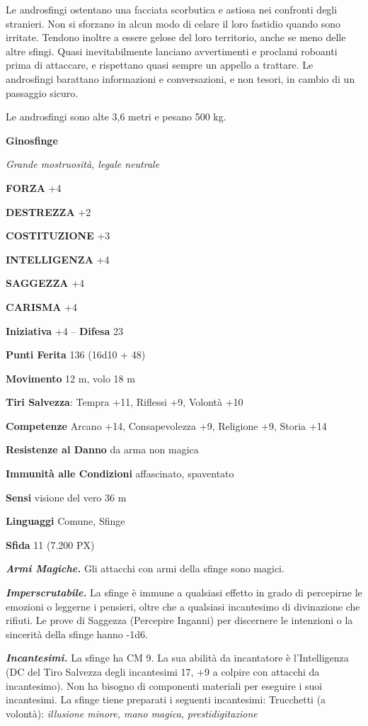 \begin{multicols}{2}
	Le androsfingi ostentano una facciata scorbutica e astiosa nei confronti degli stranieri. Non si sforzano in alcun modo di celare il loro fastidio quando sono irritate. Tendono inoltre a essere gelose del loro territorio, anche se meno delle altre sfingi. Quasi inevitabilmente lanciano avvertimenti e proclami roboanti prima di attaccare, e rispettano quasi sempre un appello a trattare. Le androsfingi barattano informazioni e conversazioni, e non tesori, in cambio di un passaggio sicuro.

	Le androsfingi sono alte 3,6 metri e pesano 500 kg.


	\medskip{}\textbf{Ginosfinge}

	\textit{Grande mostruosità, legale neutrale}

	\textbf{FORZA} +4

	\textbf{DESTREZZA} +2

	\textbf{COSTITUZIONE} +3

	\textbf{INTELLIGENZA} +4

	\textbf{SAGGEZZA} +4

	\textbf{CARISMA} +4

	\textbf{Iniziativa} +4 -- \textbf{Difesa} 23

	\textbf{Punti Ferita} 136 (16d10 + 48)

	\textbf{Movimento} 12 m, volo 18 m

	\textbf{Tiri Salvezza}: Tempra +11, Riflessi +9, Volontà +10

	\textbf{Competenze} Arcano +14, Consapevolezza +9, Religione +9, Storia +14

	\textbf{Resistenze al Danno} da arma non magica

	\textbf{Immunità alle Condizioni} affascinato, spaventato

	\textbf{Sensi} visione del vero 36 m

	\textbf{Linguaggi} Comune, Sfinge

	\textbf{Sfida} 11 (7.200 PX)

	\textit{\textbf{Armi Magiche.}} Gli attacchi con armi della sfinge sono magici.

	\textit{\textbf{Imperscrutabile.}} La sfinge è immune a qualsiasi effetto in grado di percepirne le emozioni o leggerne i pensieri, oltre che a qualsiasi incantesimo di divinazione che rifiuti. Le prove di Saggezza (Percepire Inganni) per discernere le intenzioni o la sincerità della sfinge hanno -1d6.

	\textit{\textbf{Incantesimi.}} La sfinge ha CM 9. La sua abilità da incantatore è l'Intelligenza (DC del Tiro Salvezza degli incantesimi 17, +9 a colpire con attacchi da incantesimo). Non ha bisogno di componenti materiali per eseguire i suoi incantesimi. La sfinge tiene preparati i seguenti incantesimi: Trucchetti (a volontà): \textit{illusione minore, mano magica,} \textit{prestidigitazione}


\end{multicols}
